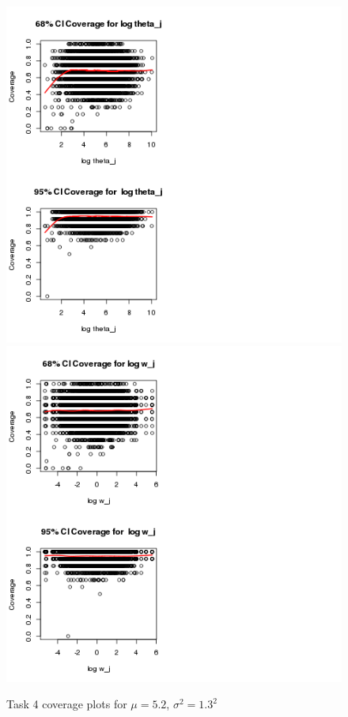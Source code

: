 \documentclass[paper=a4, fontsize=11pt]{scrartcl}
\begin{document}
\begin{figure}[h!]
  \caption{Task 4 coverage plots for $\mu = 5.2$, $\sigma^2 = 1.3^2$}
  \centering
	\includegraphics[scale=1, trim = 80 0 150 0]{keskici_wxiao_ps2_task4_plot5.png}
		\includegraphics[scale=1, trim = 100 0 300 0]{keskici_wxiao_ps2_task4_plot6.png}
\end{figure}
\end{document}

